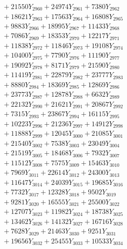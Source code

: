 \documentclass[a4paper,10pt]{article}
\begin{document}
{\begin{align}
&\;  + 21550 Y_{2960} + 24974 Y_{2961} + 7380 Y_{2962} \\[0.3ex]
&\;  + 18621 Y_{2963} + 17563 Y_{2964} + 16808 Y_{2965} \\[0.3ex]
&\;  + 9883 Y_{2966} + 18995 Y_{2967} + 11433 Y_{2968} \\[0.5ex]\allowbreak
&\;  + 7086 Y_{2969} + 18353 Y_{2970} + 12217 Y_{2971} \\[0.3ex]
&\;  + 11838 Y_{2972} + 11846 Y_{2973} + 19108 Y_{2974} \\[0.3ex]
&\;  + 10400 Y_{2975} + 7790 Y_{2976} + 11190 Y_{2977} \\[0.3ex]
&\;  + 19092 Y_{2978} + 8171 Y_{2979} + 21590 Y_{2980} \\[0.3ex]
&\;  + 11419 Y_{2981} + 22879 Y_{2982} + 23777 Y_{2983} \\[0.3ex]
&\;  + 8880 Y_{2984} + 18369 Y_{2985} + 12869 Y_{2986} \\[0.3ex]
&\;  + 23773 Y_{2987} + 12878 Y_{2988} + 6632 Y_{2989} \\[0.3ex]
&\;  + 22132 Y_{2990} + 21621 Y_{2991} + 20867 Y_{2992} \\[0.3ex]
&\;  + 7315 Y_{2993} + 23867 Y_{2994} + 16115 Y_{2995} \\[0.3ex]
&\;  + 10223 Y_{2996} + 21236 Y_{2997} + 14912 Y_{2998} \\[0.5ex]\allowbreak
&\;  + 11888 Y_{2999} + 12045 Y_{3000} + 21085 Y_{3001} \\[0.3ex]
&\;  + 21540 Y_{3002} + 7538 Y_{3003} + 23049 Y_{3004} \\[0.3ex]
&\;  + 21519 Y_{3005} + 18468 Y_{3006} + 7932 Y_{3007} \\[0.3ex]
&\;  + 11512 Y_{3008} + 7575 Y_{3009} + 15463 Y_{3010} \\[0.3ex]
&\;  + 7969 Y_{3011} + 22614 Y_{3012} + 24300 Y_{3013} \\[0.3ex]
&\;  + 11647 Y_{3014} + 24039 Y_{3015} + 19685 Y_{3016} \\[0.3ex]
&\;  + 7732 Y_{3017} + 12328 Y_{3018} + 9502 Y_{3019} \\[0.3ex]
&\;  + 9281 Y_{3020} + 16555 Y_{3021} + 25500 Y_{3022} \\[0.3ex]
&\;  + 12707 Y_{3023} + 11982 Y_{3024} + 18738 Y_{3025} \\[0.3ex]
&\;  + 13462 Y_{3026} + 14132 Y_{3027} + 16716 Y_{3028} \\[0.5ex]\allowbreak
&\;  + 7628 Y_{3029} + 21463 Y_{3030} + 9251 Y_{3031} \\[0.3ex]
&\;  + 19656 Y_{3032} + 25455 Y_{3033} + 10533 Y_{3034} \\[0.3ex]

\end{align}}
\end{document}
